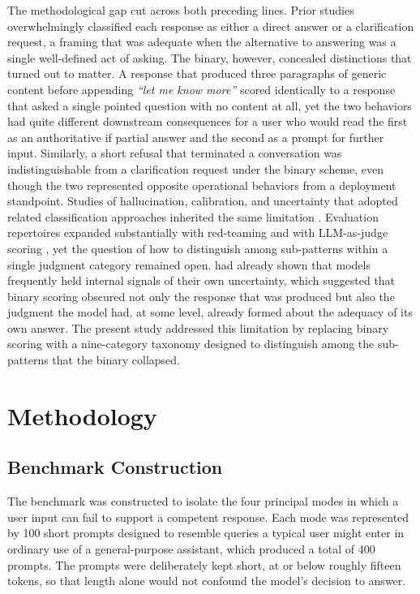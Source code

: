 \documentclass[10pt]{article}
\begin{document}
The methodological gap cut across both preceding lines. Prior studies overwhelmingly classified each response as either a direct answer or a clarification request, a framing that was adequate when the alternative to answering was a single well-defined act of asking. The binary, however, concealed distinctions that turned out to matter. A response that produced three paragraphs of generic content before appending \emph{``let me know more''} scored identically to a response that asked a single pointed question with no content at all, yet the two behaviors had quite different downstream consequences for a user who would read the first as an authoritative if partial answer and the second as a prompt for further input. Similarly, a short refusal that terminated a conversation was indistinguishable from a clarification request under the binary scheme, even though the two represented opposite operational behaviors from a deployment standpoint. Studies of hallucination, calibration, and uncertainty that adopted related classification approaches inherited the same limitation \citep{kadavath2022know,ji2023survey,guo2017calibration,lin2022teaching,xiong2024can}. Evaluation repertoires expanded substantially with red-teaming \citep{ganguli2022red} and with LLM-as-judge scoring \citep{zheng2023judging}, yet the question of how to distinguish among sub-patterns within a single judgment category remained open. \citet{kadavath2022know} had already shown that models frequently held internal signals of their own uncertainty, which suggested that binary scoring obscured not only the response that was produced but also the judgment the model had, at some level, already formed about the adequacy of its own answer. The present study addressed this limitation by replacing binary scoring with a nine-category taxonomy designed to distinguish among the sub-patterns that the binary collapsed.

\section{Methodology}
\label{sec:method}

\subsection{Benchmark Construction}

The benchmark was constructed to isolate the four principal modes in which a user input can fail to support a competent response. Each mode was represented by 100 short prompts designed to resemble queries a typical user might enter in ordinary use of a general-purpose assistant, which produced a total of 400 prompts. The prompts were deliberately kept short, at or below roughly fifteen tokens, so that length alone would not confound the model's decision to answer.
\end{document}
